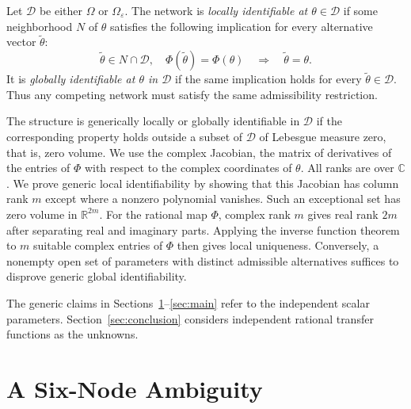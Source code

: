 \documentclass[letterpaper,10pt,conference]{ieeeconf}
\newcommand{\aicite}{\texorpdfstring{\protect\cite{codex}}{}}
\begin{document}
Let \(\mathcal D\) be either \(\Omega\) or \(\Omega_\varepsilon\).
The network is \emph{locally identifiable at \(\theta\in\mathcal D\)}
if some neighborhood \(N\) of \(\theta\) satisfies the following
implication for every alternative vector \(\widetilde\theta\):
\[
 \widetilde\theta\in N\cap\mathcal D,\quad
 \Phi(\widetilde\theta)=\Phi(\theta)
 \quad\Longrightarrow\quad \widetilde\theta=\theta.
\]
It is \emph{globally identifiable at \(\theta\) in \(\mathcal D\)}
if the same implication holds for every
\(\widetilde\theta\in\mathcal D\). Thus any competing network must satisfy
the same admissibility restriction.

The structure is generically locally or globally identifiable in
\(\mathcal D\) if the corresponding property holds outside a subset of
\(\mathcal D\) of Lebesgue measure zero, that is, zero volume.
We use the complex Jacobian, the matrix of derivatives of the entries
of \(\Phi\) with respect to the complex coordinates of \(\theta\).
All ranks are over \(\mathbb C\).
We prove generic local identifiability by showing that this Jacobian
has column rank \(m\) except where a nonzero polynomial vanishes.
Such an exceptional set has zero volume in \(\mathbb R^{2m}\).
For the rational map \(\Phi\), complex rank \(m\) gives real rank \(2m\)
after separating real and imaginary parts. Applying the inverse function
theorem to \(m\) suitable complex entries of \(\Phi\) then gives local
uniqueness. Conversely, a nonempty open
set of parameters with distinct admissible alternatives suffices to
disprove generic global identifiability.

The generic claims in Sections~\ref{sec:base}--\ref{sec:main} refer to
the independent scalar parameters. Section~\ref{sec:conclusion}
considers independent rational transfer functions as the unknowns.

\section{A Six-Node Ambiguity \aicite}
\label{sec:base}
\end{document}
